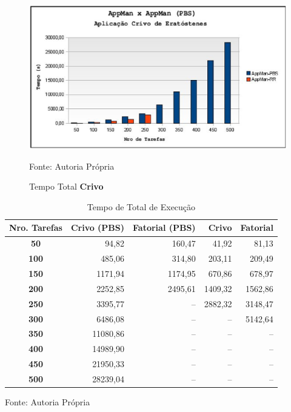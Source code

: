\begin{figure}[hbtp]
\begin{center}
\includegraphics[scale=0.7]{./img/MapaCrivoTempoTotal.ps}
\caption{Tempo Total \textbf{Crivo}}
\label{fig:crivo_total}
Fonte: Autoria Própria
\end{center}
\end{figure}

\begin{table}[hbtp]
\begin{center}
\caption{Tempo de Total de Execução}
\label{tab:tempo_total}
\begin{tabular}{c|r|r|r|r}
	\hline
		{\bf Nro. Tarefas } & {\bf Crivo (PBS)} & {\bf Fatorial (PBS)} & {\bf Crivo} & {\bf Fatorial}\\
	\hline
	{\bf 50} & 94,82 & 160,47 & 41,92 & 81,13\\ \hline
	{\bf 100} & 485,06 & 314,80 & 203,11 & 209,49\\ \hline
	{\bf 150} & 1171,94 & 1174,95 & 670,86 & 678,97\\ \hline
	{\bf 200} & 2252,85 & 2495,61 & 1409,32 & 1562,86\\ \hline
	{\bf 250} & 3395,77 & -- & 2882,32 & 3148,47\\ \hline
	{\bf 300} & 6486,08 & -- & -- & 5142,64\\ \hline
	{\bf 350} & 11080,86 & -- & -- & --\\ \hline
	{\bf 400} & 14989,90 & -- & -- & --\\ \hline
	{\bf 450} & 21950,33 & -- & -- & --\\ \hline
	{\bf 500} & 28239,04 & -- & -- & --\\ \hline
\end{tabular}
\end{center}
\begin{center}
Fonte: Autoria Própria
\end{center}
\end{table}
	
